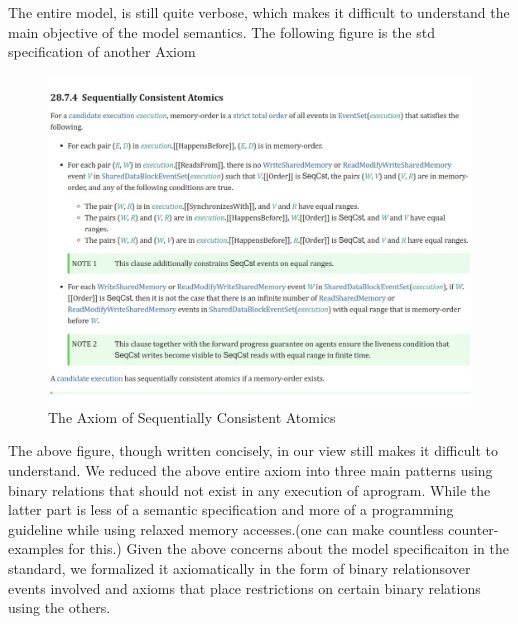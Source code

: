     The entire model, is still quite verbose, which makes it difficult to understand the main objective of the model semantics. 
    The following figure is the std specification of another Axiom 
    \begin{figure}[H]
        \centering 
        \includegraphics[scale=0.5]{ECMAScriptMemoryModel/ECMAScriptStdSeqCnsAt.pdf}
        \caption{The Axiom of Sequentially Consistent Atomics}
    \end{figure}
    The above figure, though written concisely, in our view still makes it difficult to understand. 
    We reduced the above entire axiom into three main patterns using binary relations that should not exist in any execution of aprogram. 
    While the latter part is less of a semantic specification and more of a programming guideline while using relaxed memory accesses.(one can make countless counter-examples for this.) 
Given the above concerns about the model specificaiton in the standard, we formalized it axiomatically in the form of binary relationsover events involved and axioms that place restrictions on certain binary relations using the others. 



















